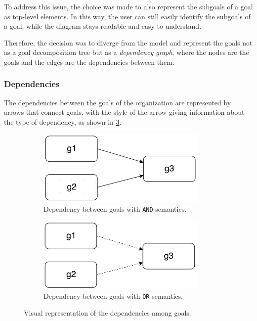 To address this issue, the choice was made to also represent the subgoals of a goal as top-level elements.
In this way, the user can still easily identify the subgoals of a goal, while the diagram stays readable and easy to understand.

Therefore, the decision was to diverge from the \moise{} model and represent the goals not as a goal decomposition tree but as a \textit{dependency graph}, where the nodes are the goals and the edges are the dependencies between them.

\subsubsection{Dependencies}
The dependencies between the goals of the organization are represented by arrows that connect goals, with the style of the arrow giving information about the type of dependency, as shown in \cref{fig:dependencies}.

\begin{figure}[H]
    \begin{subfigure}[h]{0.5\linewidth}
        \centering
        \includegraphics[width=0.9\textwidth]{images/visual-language/dependency-and.png}
        \caption{Dependency between goals with \texttt{AND} semantics.}
        \label{fig:dependency-and}
    \end{subfigure}
    \begin{subfigure}[h]{0.5\linewidth}
        \centering
        \includegraphics[width=0.9\textwidth]{images/visual-language/dependency-or.png}
        \caption{Dependency between goals with \texttt{OR} semantics.}
        \label{fig:dependency-or}
    \end{subfigure}
    \caption{Visual representation of the dependencies among goals.}
    \label{fig:dependencies}
\end{figure}

